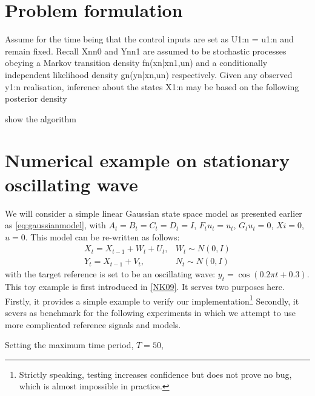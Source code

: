 \section{Problem formulation}

Assume for the time being that the control inputs are set as U1:n = u1:n and remain fixed. Recall {Xn}n0 and {Yn}n1 are assumed to be stochastic processes obeying a Markov transition density fn(xn|xn1,un) and a conditionally independent likelihood density gn(yn|xn,un) respectively. Given any observed y1:n realisation, inference about the states X1:n may be based on the following posterior density


show the algorithm


\section{Numerical example on stationary oscillating wave}
We will consider a simple linear Gaussian state space model as presented earlier as \eqref{eq:gaussianmodel}, with $A_t=B_t=C_t=D_t=I$, $F_t{u_t}=u_t$, $G_t{u_t}=0$, $Xi = 0$, $u=0$. This model can be re-written as follows:
\begin{align}
  X_t = X_{t-1} + W_t + U_t, & W_t \sim N(0,I) \\
Y_t = X_{t-1} + V_t, & N_t \sim N(0,I)
\label{eq:refnmodel}
\end{align}
with the target reference is set to be an oscillating wave: $y_t = \cos(0.2 \pi t + 0.3)$. This toy example is first introduced in \ref{NK09}. It serves two purposes here. Firstly, it provides a simple example to verify our implementation\footnote{Strictly speaking, testing increases confidence but  does not prove no bug, which is almost impossible in practice.} Secondly, it severs as benchmark for the following experiments in which we attempt to use more complicated reference signals and models.

Setting the maximum time period, $T=50$, 

